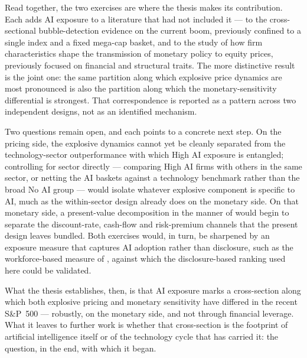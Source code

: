 Read together, the two exercises are where the thesis makes its
contribution. Each adds AI exposure to a literature that had not
included it --- to the cross-sectional bubble-detection evidence on
the current boom, previously confined to a single index and a fixed
mega-cap basket, and to the study of how firm characteristics shape
the transmission of monetary policy to equity prices, previously
focused on financial and structural traits. The more distinctive
result is the joint one: the same partition along which explosive
price dynamics are most pronounced is also the partition along which
the monetary-sensitivity differential is strongest. That
correspondence is reported as a pattern across two independent
designs, not as an identified mechanism.

Two questions remain open, and each points to a concrete next step. On
the pricing side, the explosive dynamics cannot yet be cleanly
separated from the technology-sector outperformance with which High AI
exposure is entangled; controlling for sector directly --- comparing
High AI firms with others in the same sector, or netting the AI
baskets against a technology benchmark rather than the broad No AI
group --- would isolate whatever explosive component is specific to AI,
much as the within-sector design already does on the monetary side. On
that monetary side, a present-value decomposition in the manner of
\citet{campbellAmmer1993} would begin to separate the discount-rate,
cash-flow and risk-premium channels that the present design leaves
bundled. Both exercises would, in turn, be sharpened by an exposure
measure that captures AI adoption rather than disclosure, such as the
workforce-based measure of \citet{eisfeldtSchubertZhangTaska2023},
against which the disclosure-based ranking used here could be
validated.

What the thesis establishes, then, is that AI exposure marks a
cross-section along which both explosive pricing and monetary
sensitivity have differed in the recent S\&P~500 --- robustly, on the
monetary side, and not through financial leverage. What it leaves to
further work is whether that cross-section is the footprint of
artificial intelligence itself or of the technology cycle that has
carried it: the question, in the end, with which it began.
